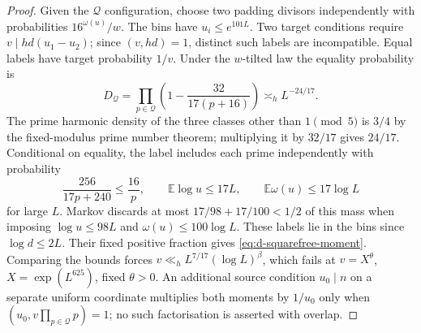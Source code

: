 \documentclass[11pt]{article}
\theoremstyle{definition}
\newcommand{\E}{\mathbb E}
\theoremstyle{remark}
\numberwithin{equation}{section}
\begin{document}
\begin{proof}
Given the $\mathcal Q$ configuration, choose two padding divisors independently with probabilities
$16^{\omega(u)}/w$. The bins have $u_i\le e^{101L}$.
Two target conditions require $v\mid hd(u_1-u_2)$; since $(v,hd)=1$, distinct such labels are
incompatible. Equal labels have target probability $1/v$.
Under the $w$-tilted law the equality probability is
\begin{equation}\label{eq:d-squarefree-collision}
 D_{\mathcal Q}=\prod_{p\in\mathcal Q}\left(1-\frac{32}{17(p+16)}\right)\asymp_h L^{-24/17}.
\end{equation}
The prime harmonic density of the three classes other than $1\pmod5$ is $3/4$ by the fixed-modulus
prime number theorem; multiplying it by $32/17$ gives $24/17$.
Conditional on equality, the label includes each prime independently with probability
\begin{equation}\label{eq:d-squarefree-eligible}
 \frac{256}{17p+240}\le\frac{16}p,\qquad
 \E\log u\le17L,\qquad\E\omega(u)\le17\log L
\end{equation}
for large $L$. Markov discards at most $17/98+17/100<1/2$ of this mass when imposing
$\log u\le98L$ and $\omega(u)\le100\log L$. These labels lie in the bins since $\log d\le2L$.
Their fixed positive fraction gives \eqref{eq:d-squarefree-moment}. Comparing the bounds forces
$v\ll_h L^{7/17}(\log L)^\beta$, which fails at $v=X^\theta$, $X=\exp(L^{625})$, fixed $\theta>0$.
An additional source condition $u_0\mid n$ on a separate uniform coordinate multiplies both moments
by $1/u_0$ only when $(u_0,v\prod_{p\in\mathcal Q}p)=1$; no such factorisation is asserted with overlap.
\end{proof}
\end{document}
